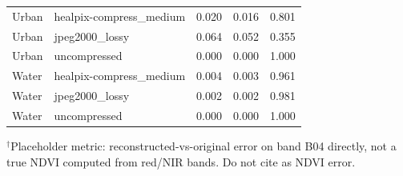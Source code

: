\begin{table}[t]
\begin{tabular}{@{}llrrr@{}}
$$Urban       & healpix-compress\_medium & 0.020 & 0.016 & 0.801 \\
Urban       & jpeg2000\_lossy          & 0.064 & 0.052 & 0.355 \\
Urban       & uncompressed             & 0.000 & 0.000 & 1.000 \\
Water       & healpix-compress\_medium & 0.004 & 0.003 & 0.961 \\
Water       & jpeg2000\_lossy          & 0.002 & 0.002 & 0.981 \\
Water       & uncompressed             & 0.000 & 0.000 & 1.000 \\
\bottomrule
\end{tabular}

\vspace{2pt}
{\footnotesize $^\dagger$Placeholder metric: reconstructed-vs-original error on band B04 directly, not a true NDVI computed from red/NIR bands. Do not cite as NDVI error.}
\end{table}
